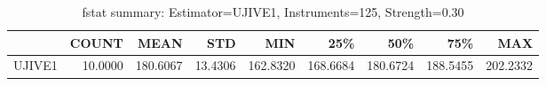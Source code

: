 \begin{table}[ht]
\centering
\caption{fstat summary: Estimator=UJIVE1, Instruments=125, Strength=0.30}
\begin{tabular}{lrrrrrrrr}
\toprule
 & COUNT & MEAN & STD & MIN & 25\% & 50\% & 75\% & MAX \\
\midrule
UJIVE1 & 10.0000 & 180.6067 & 13.4306 & 162.8320 & 168.6684 & 180.6724 & 188.5455 & 202.2332 \\
\bottomrule
\end{tabular}
\end{table}

